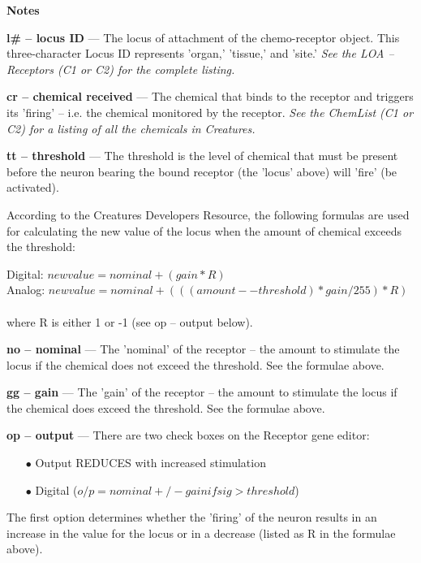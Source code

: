\documentclass[11pt,twoside,a4paper]{article}
\begin{document}
\textbf{\large Notes}


\textbf{l\# -- locus ID} --- The locus of attachment of the chemo-receptor object. This three-character Locus ID represents 'organ,' 'tissue,' and 'site.'
\emph{See the LOA -- Receptors (C1 or C2) for the complete listing. }

\textbf{cr -- chemical received} --- The chemical that binds to the receptor and triggers its 'firing' -- i.e. the chemical monitored by the receptor.
\emph{See the ChemList (C1 or C2) for a listing of all the chemicals in Creatures.}

\textbf{tt -- threshold} --- The threshold is the level of chemical that must be present before the neuron bearing the bound receptor (the 'locus' above) will 'fire' (be activated).

According to the Creatures Developers Resource, the following formulas are used for calculating the new value of the locus when the amount of chemical exceeds the threshold:

	Digital: $new value = nominal + (gain * R)$ ~\\
	Analog: $new value = nominal + (((amount -- threshold) * gain/255) * R)$ ~\\
	where R is either 1 or -1 (see op -- output below).

\textbf{no -- nominal} --- The 'nominal' of the receptor -- the amount to stimulate the locus if the chemical does not exceed the threshold. See the formulae above.

\textbf{gg -- gain} --- The 'gain' of the receptor -- the amount to stimulate the locus if the chemical does exceed the threshold. See the formulae above.

\textbf{op -- output} --- There are two check boxes on the Receptor gene editor:
\begin{itemize}
	\item[$\bullet$] Output REDUCES with increased stimulation
	\item[$\bullet$] Digital ($o/p = nominal +/- gain if sig > threshold$)
\end{itemize}

The first option determines whether the 'firing' of the neuron results in an increase in the value for the locus or in a decrease (listed as R in the formulae above).
\end{document}
